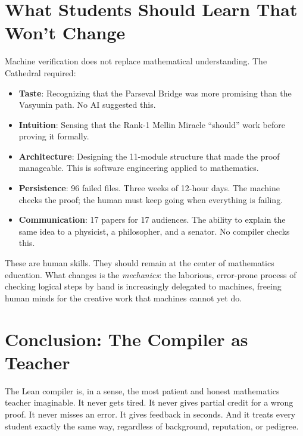\documentclass[11pt,a4paper]{article}
\begin{document}
\section{What Students Should Learn That Won't Change}

Machine verification does not replace mathematical understanding.
The Cathedral required:

\begin{itemize}
  \item \textbf{Taste}: Recognizing that the Parseval Bridge was
    more promising than the Vasyunin path. No AI suggested this.
  \item \textbf{Intuition}: Sensing that the Rank-1 Mellin Miracle
    ``should'' work before proving it formally.
  \item \textbf{Architecture}: Designing the 11-module structure
    that made the proof manageable. This is software engineering
    applied to mathematics.
  \item \textbf{Persistence}: 96 failed files. Three weeks of
    12-hour days. The machine checks the proof; the human must
    keep going when everything is failing.
  \item \textbf{Communication}: 17 papers for 17 audiences. The
    ability to explain the same idea to a physicist, a philosopher,
    and a senator. No compiler checks this.
\end{itemize}

These are human skills. They should remain at the center of
mathematics education. What changes is the \emph{mechanics}:
the laborious, error-prone process of checking logical steps by
hand is increasingly delegated to machines, freeing human minds
for the creative work that machines cannot yet do.

\section{Conclusion: The Compiler as Teacher}

The Lean compiler is, in a sense, the most patient and honest
mathematics teacher imaginable. It never gets tired. It never
gives partial credit for a wrong proof. It never misses an error.
It gives feedback in seconds. And it treats every student exactly
the same way, regardless of background, reputation, or pedigree.
\end{document}
